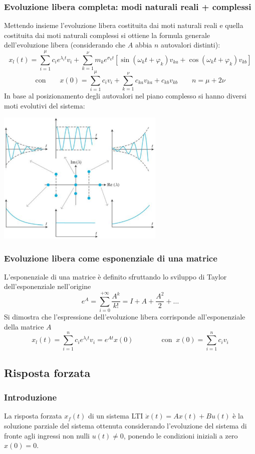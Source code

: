 \subsubsection*{Evoluzione libera completa: modi naturali reali + complessi}
Mettendo insieme l'evoluzione libera costituita dai moti naturali reali e quella costituita dai moti naturali complessi si ottiene
la formula generale dell'evoluzione libera (considerando che \(A\) abbia \(n\) autovalori distinti):
\[x_l(t) = \sum_{i=1}^{\mu} c_i e^{\lambda_i t} v_i + \sum_{k=1}^{\nu} m_k e^{\sigma_k t} [ \sin(\omega_k t + \varphi_k) v_{ka} + \cos (\omega_k t + \varphi_k) v_{kb}]\]
\[\text{con} \qquad x(0) = \sum_{i=1}^{\mu} c_i v_i + \sum_{k=1}^{\nu} c_{ka} v_{ka} + c_{kb} v_{kb} \qquad n = \mu + 2\nu\]
In base al posizionamento degli autovalori nel piano complesso si hanno diversi moti evolutivi del sistema:
\begin{center}
	\includegraphics[width=0.6\textwidth]{immagini/evoluzione libera generale.png}
\end{center}

\subsubsection*{Evoluzione libera come esponenziale di una matrice}
L'esponenziale di una matrice è definito sfruttando lo sviluppo di Taylor dell'esponenziale nell'origine
\[e^A = \sum_{i=0}^{+\infty} \frac{A^k}{k!} = I + A + \frac{A^2}{2} + \dots\]
Si dimostra che l'espressione dell'evoluzione libera corrisponde all'esponenziale della matrice \(A\)
\[x_l(t) = \sum_{i=1}^{n} c_i e^{\lambda_i t} v_i = e^{At} x(0) \qquad \qquad \text{con} \;\; x(0) = \sum_{i=1}^{n} c_i v_i\]

\subsection{Risposta forzata}
\subsubsection*{Introduzione}
La risposta forzata \(x_f(t)\) di un sistema LTI \(\dot{x}(t) = Ax(t) + Bu(t)\) è la soluzione parziale del sistema ottenuta
considerando l'evoluzione del sistema di fronte agli ingressi non nulli \(u(t) \neq 0\), ponendo le condizioni
iniziali a zero \(x(0) = 0\).

